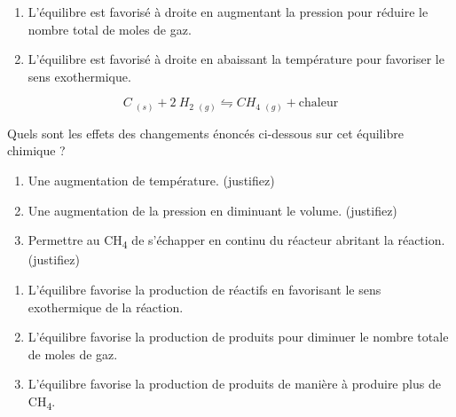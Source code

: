 \documentclass[
  11pt,
  a4paper,
  openany]{book}
\providecommand{\tightlist}{%
  \setlength{\itemsep}{0pt}\setlength{\parskip}{0pt}}
\begin{document}
\begin{Answer}

\begin{enumerate}
\def\labelenumi{\alph{enumi}.}
\tightlist
\item
  L'équilibre est favorisé à droite en augmentant la pression pour réduire le nombre total de moles de gaz.
\item
  L'équilibre est favorisé à droite en abaissant la température pour favoriser le sens exothermique.
\end{enumerate}

\end{Answer}

\clearpage

\begin{Exercise}

\[
  C\ _{(s)} + 2\ H_2\ _{(g)} \leftrightharpoons CH_4\ _{(g)} + \text{chaleur}
\]

Quels sont les effets des changements énoncés ci-dessous sur cet équilibre chimique ?

\begin{enumerate}
\def\labelenumi{\alph{enumi}.}
\tightlist
\item
  Une augmentation de température. (justifiez)
\item
  Une augmentation de la pression en diminuant le volume. (justifiez)
\item
  Permettre au CH\textsubscript{4} de s'échapper en continu du réacteur abritant la réaction. (justifiez)
\end{enumerate}

\end{Exercise}

\begin{Answer}

\begin{enumerate}
\def\labelenumi{\alph{enumi}.}
\tightlist
\item
  L'équilibre favorise la production de réactifs en favorisant le sens exothermique de la réaction.
\item
  L'équilibre favorise la production de produits pour diminuer le nombre totale de moles de gaz.
\item
  L'équilibre favorise la production de produits de manière à produire plus de CH\textsubscript{4}.
\end{enumerate}

\end{Answer}
\end{document}
